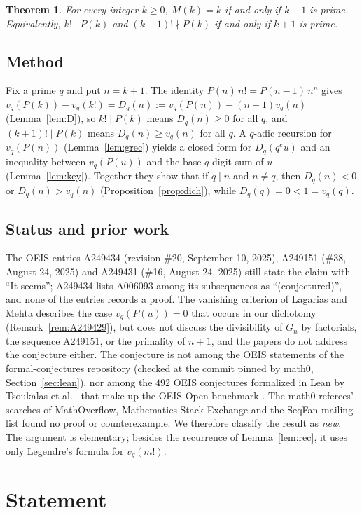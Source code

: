 \documentclass[11pt]{amsart}
\theoremstyle{plain}
\newtheorem{theorem}{Theorem}
\theoremstyle{definition}
\begin{document}
\begin{theorem}\label{thm:main}
For every integer $k\ge0$, $M(k)=k$ if and only if $k+1$ is prime. Equivalently, $k!\mid P(k)$ and $(k+1)!\nmid P(k)$ if and only if $k+1$ is prime.
\end{theorem}

\subsection*{Method}
Fix a prime $q$ and put $n=k+1$. The identity $P(n)\,n!=P(n-1)\,n^{n}$ gives $v_q(P(k))-v_q(k!)=D_q(n):=v_q(P(n))-(n-1)v_q(n)$ (Lemma~\ref{lem:D}), so $k!\mid P(k)$ means $D_q(n)\ge0$ for all $q$, and $(k+1)!\mid P(k)$ means $D_q(n)\ge v_q(n)$ for all $q$.
A $q$-adic recursion for $v_q(P(n))$ (Lemma~\ref{lem:grec}) yields a closed form for $D_q(q^eu)$ and an inequality between $v_q(P(u))$ and the base-$q$ digit sum of $u$ (Lemma~\ref{lem:key}). Together they show that if $q\mid n$ and $n\ne q$, then $D_q(n)<0$ or $D_q(n)>v_q(n)$ (Proposition~\ref{prop:dich}), while $D_q(q)=0<1=v_q(q)$.

\subsection*{Status and prior work}
The OEIS entries A249434 (revision \#20, September 10, 2025), A249151 (\#38, August 24, 2025) and A249431 (\#16, August 24, 2025) still state the claim with ``It seems''; A249434 lists A006093 among its subsequences as ``(conjectured)'', and none of the entries records a proof.
The vanishing criterion of Lagarias and Mehta \cite[Theorem~6.7]{LM} describes the case $v_q(P(u))=0$ that occurs in our dichotomy (Remark~\ref{rem:A249429}), but \cite{LM} does not discuss the divisibility of $G_n$ by factorials, the sequence A249151, or the primality of $n+1$, and the papers \cite{DL,DLY} do not address the conjecture either.
The conjecture is not among the OEIS statements of the formal-conjectures repository \cite{FC} (checked at the commit pinned by math0, Section~\ref{sec:lean}), nor among the $492$ OEIS conjectures formalized in Lean by Tsoukalas et al.\ \cite{APN} that make up the OEIS Open benchmark \cite{Ad}. The math0 referees' searches of MathOverflow, Mathematics Stack Exchange and the SeqFan mailing list found no proof or counterexample.
We therefore classify the result as \emph{new}. The argument is elementary; besides the recurrence of Lemma~\ref{lem:rec}, it uses only Legendre's formula for $v_q(m!)$.

\section{Statement}\label{sec:statement}
\end{document}
